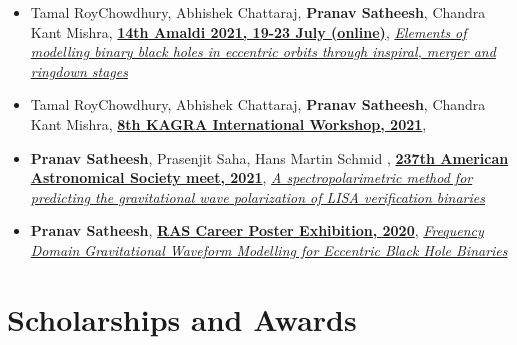 \documentclass[margin, centered]{res}
\begin{document}
\begin{resume}
\begin{itemize}[leftmargin=*]
    \item Tamal RoyChowdhury, Abhishek Chattaraj, \textbf{Pranav Satheesh}, Chandra Kant Mishra, \href{https://www.amaldi14.org/}{\textbf{14th Amaldi 2021, 19-23 July (online)}}, \href{https://drive.google.com/file/d/1tCGgniOafmLfrbhD4X7ca3VkhOJtOSc2/view?usp=sharing}{\color{C2} \textit{Elements of modelling binary black holes in eccentric orbits through inspiral, merger and ringdown stages}}\\
    
    \item Tamal RoyChowdhury, Abhishek Chattaraj, \textbf{Pranav Satheesh}, Chandra Kant Mishra, \href{http://kiw8.org/program/}{\textbf{8th KAGRA International Workshop, 2021}}, \href{http://kiw8.org/data/users/348932af5b3e54a8958255b121ccef68/poster/50_pranavsatheesh-poster.pdf}{}
    
    \item \textbf{Pranav Satheesh}, Prasenjit Saha, Hans Martin Schmid , \href{https://aas.org/meetings/aas237}{\textbf{237th American Astronomical Society meet, 2021}}, \href{aas237-aas.ipostersessions.com/Default.aspx?s=79-64-0C-43-B0-53-8B-48-C7-A1-41-CE-DF-A9-70-2A}{\color{C2}\textit{A spectropolarimetric method for predicting the gravitational wave polarization of LISA verification binaries}}
    
    \item  \textbf{Pranav Satheesh}, \href{https://ras.ac.uk/ras-2020-posters}{\textbf{RAS Career Poster Exhibition, 2020}}, \href{https://ras.ac.uk/poster-contest/pranav-satheesh}{\color{C2} {\textit{Frequency Domain Gravitational Waveform Modelling for Eccentric Black Hole Binaries}}}\\ 
    

\end{itemize}   

\section{Scholarships and Awards}
\begin{itemize}[leftmargin=*]


\end{itemize}
\end{resume}
\end{document}
